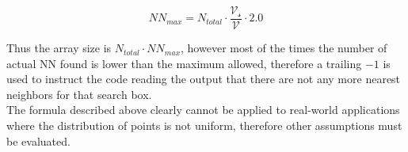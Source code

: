 \begin{center}
\begin{equation}
N\!N_{max} =  N_{total} \cdot \dfrac{\mathcal{V_s}}{\mathcal{V}} \cdot 2.0
\end{equation}
\end{center}

Thus the array size is $N_{total} \cdot N\!N_{max}$, however most of the times the number of actual NN found is lower than the maximum allowed, therefore a trailing $-1$ is used to instruct the code reading the output that there are not any more nearest neighbors for that search box.\\
The formula described above clearly cannot be applied to real-world applications where the distribution of points is not uniform, therefore other assumptions must be evaluated.\\

